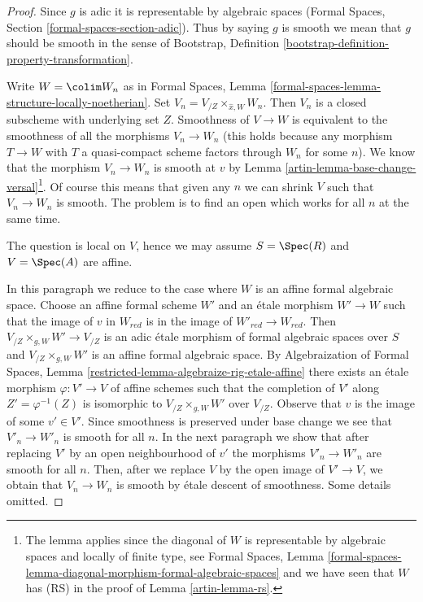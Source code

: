 \begin{proof}

Since $g$ is adic it is representable by algebraic spaces (Formal Spaces,
Section \ref{formal-spaces-section-adic}).
Thus by saying $g$ is smooth we mean that $g$ should be smooth
in the sense of
Bootstrap, Definition \ref{bootstrap-definition-property-transformation}.

\medskip\noindent
Write $W = \colim W_n$ as in Formal Spaces, Lemma
\ref{formal-spaces-lemma-structure-locally-noetherian}.
Set $V_n = V_{/Z} \times_{\hat x, W} W_n$.
Then $V_n$ is a closed subscheme with underlying set $Z$.
Smoothness of $V \to W$ is equivalent to the smoothness
of all the morphisms $V_n \to W_n$ (this holds because any morphism
$T \to W$ with $T$ a quasi-compact scheme factors through
$W_n$ for some $n$). We know that the morphism $V_n \to W_n$
is smooth at $v$ by
Lemma \ref{artin-lemma-base-change-versal}\footnote{The lemma applies since
the diagonal of $W$ is representable by algebraic spaces and
locally of finite type, see Formal Spaces, Lemma
\ref{formal-spaces-lemma-diagonal-morphism-formal-algebraic-spaces}
and we have seen that $W$ has (RS) in the proof of Lemma \ref{artin-lemma-rs}.}.
Of course this means that given any $n$ we can shrink $V$
such that $V_n \to W_n$ is smooth. The problem is to find
an open which works for all $n$ at the same time.

\medskip\noindent
The question is local on $V$, hence we may assume $S = \Spec(R)$ and
$V = \Spec(A)$ are affine.

\medskip\noindent
In this paragraph we reduce to the case where $W$ is an affine formal
algebraic space. Choose an affine formal scheme $W'$ and an \'etale morphism
$W' \to W$ such that the image of $v$ in $W_{red}$ is in the
image of $W'_{red} \to W_{red}$. Then $V_{/Z} \times_{g, W} W' \to V_{/Z}$
is an adic \'etale morphism of formal algebraic spaces over $S$
and $V_{/Z} \times_{g, W} W'$ is an affine formal algebraic space.
By Algebraization of Formal Spaces,
Lemma \ref{restricted-lemma-algebraize-rig-etale-affine}
there exists an \'etale morphism $\varphi : V' \to V$ of affine schemes
such that the completion of $V'$ along $Z' = \varphi^{-1}(Z)$
is isomorphic to $V_{/Z} \times_{g, W} W'$ over $V_{/Z}$.
Observe that $v$ is the image of some $v' \in V'$.
Since smoothness is preserved under base change we see that
$V'_n \to W'_n$ is smooth for all $n$. In the next paragraph
we show that after replacing $V'$ by an open neighbourhood of $v'$
the morphisms $V'_n \to W'_n$ are smooth for all $n$.
Then, after we replace $V$ by the open image of $V' \to V$,
we obtain that $V_n \to W_n$ is smooth by \'etale descent of smoothness.
Some details omitted.


\end{proof}

